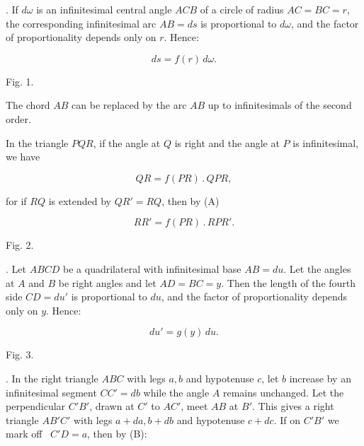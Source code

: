 \par{}%
. If $d\omega$ is an infinitesimal central angle $ACB$ of a circle of radius $AC=BC=r$, the corresponding infinitesimal arc $AB=ds$ is proportional to $d\omega$, and the factor of proportionality depends only on $r$. Hence:

\[
\tag*{(A)} ds = f(r)\,d\omega.
\]

\begin{center}\begin{minipage}{\linewidth}\centering


Fig. 1.
\end{minipage}\end{center}

\noindent The chord $AB$ can be replaced by the arc $AB$ up to infinitesimals of the second order.

\noindent In the triangle $PQR$, if the angle at $Q$ is right and the angle at $P$ is infinitesimal, we have

\[
\tag*{(A')} QR = f(PR)\,.\,QPR,
\]

\noindent for if $RQ$ is extended by $QR' = RQ$, then by (A)

\[
RR' = f(PR)\,.\,RPR'.
\]

\begin{center}\begin{minipage}{\linewidth}\centering


Fig. 2.
\end{minipage}\end{center}

. Let $ABCD$ be a quadrilateral with infinitesimal base $AB=du$. Let the angles at $A$ and $B$ be right angles and let $AD=BC=y$. Then the length of the fourth side $CD=du'$ is proportional to $du$, and the factor of proportionality depends only on $y$. Hence:

\[
\tag*{(B)} du' = g(y)\,du.
\]

\begin{center}\begin{minipage}{\linewidth}\centering


Fig. 3.
\end{minipage}\end{center}

. In the right triangle $ABC$ with legs $a,b$ and hypotenuse $c$, let $b$ increase by an infinitesimal segment $CC'=db$ while the angle $A$ remains unchanged. Let the perpendicular $C'B'$, drawn at $C'$ to $AC'$, meet $AB$ at $B'$. This gives a right triangle $AB'C'$ with legs $a+da, b+db$ and hypotenuse $c+dc$. If on $C'B'$ we mark off \ $C'D=a$, then by (B):

